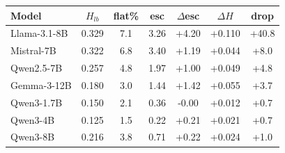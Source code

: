 \begin{tabular}{lcccccc}
\toprule
Model & $H_{lb}$ & flat\% & esc & $\Delta$esc & $\Delta H$ & drop \\
\midrule
Llama-3.1-8B & 0.329 & 7.1 & 3.26 & +4.20 & +0.110 & +40.8 \\
Mistral-7B & 0.322 & 6.8 & 3.40 & +1.19 & +0.044 & +8.0 \\
Qwen2.5-7B & 0.257 & 4.8 & 1.97 & +1.00 & +0.049 & +4.8 \\
Gemma-3-12B & 0.180 & 3.0 & 1.44 & +1.42 & +0.055 & +3.7 \\
Qwen3-1.7B & 0.150 & 2.1 & 0.36 & -0.00 & +0.012 & +0.7 \\
Qwen3-4B & 0.125 & 1.5 & 0.22 & +0.21 & +0.021 & +0.7 \\
Qwen3-8B & 0.216 & 3.8 & 0.71 & +0.22 & +0.024 & +1.0 \\
\bottomrule
\end{tabular}
